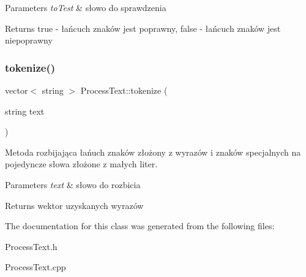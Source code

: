 \begin{DoxyParams}{Parameters}
{\em to\+Test} & słowo do sprawdzenia \\
\hline
\end{DoxyParams}
\begin{DoxyReturn}{Returns}
true -\/ łańcuch znaków jest poprawny, false -\/ łańcuch znaków jest niepoprawny 
\end{DoxyReturn}
\mbox{\label{class_process_text_a0ed75725009127382c8fec550a139ba8}} 
\subsubsection{\texorpdfstring{tokenize()}{tokenize()}}
{\footnotesize\ttfamily vector$<$ string $>$ Process\+Text\+::tokenize (\begin{DoxyParamCaption}\item[{string}]{text }\end{DoxyParamCaption})\hspace{0.3cm}{\ttfamily [protected]}}



Metoda rozbijająca łańuch znaków złożony z wyrazów i znaków specjalnych na pojedyncze słowa złożone z małych liter. 


\begin{DoxyParams}{Parameters}
{\em text} & słowo do rozbicia \\
\hline
\end{DoxyParams}
\begin{DoxyReturn}{Returns}
wektor uzyskanych wyrazów 
\end{DoxyReturn}


The documentation for this class was generated from the following files\+:\begin{DoxyCompactItemize}
\item 
Process\+Text.\+h\item 
Process\+Text.\+cpp\end{DoxyCompactItemize}
